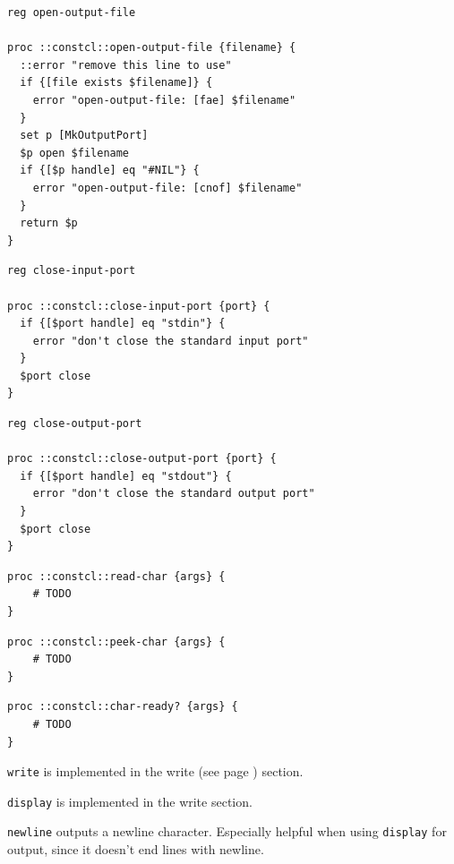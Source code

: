 \documentclass[twoside,9pt]{report}
\begin{document}
\noindent\makebox[\linewidth]{\rule{\linewidth}{0.4pt}}
\noindent\makebox[\linewidth]{\rule{\linewidth}{0.4pt}}
\begin{lstlisting}
reg open-output-file
 
proc ::constcl::open-output-file {filename} {
  ::error "remove this line to use"
  if {[file exists $filename]} {
    error "open-output-file: [fae] $filename"
  }
  set p [MkOutputPort]
  $p open $filename
  if {[$p handle] eq "#NIL"} {
    error "open-output-file: [cnof] $filename"
  }
  return $p
}
\end{lstlisting}
\noindent\makebox[\linewidth]{\rule{\linewidth}{0.4pt}}
\noindent\makebox[\linewidth]{\rule{\linewidth}{0.4pt}}
\begin{lstlisting}
reg close-input-port
 
proc ::constcl::close-input-port {port} {
  if {[$port handle] eq "stdin"} {
    error "don't close the standard input port"
  }
  $port close
}
\end{lstlisting}
\noindent\makebox[\linewidth]{\rule{\linewidth}{0.4pt}}
\noindent\makebox[\linewidth]{\rule{\linewidth}{0.4pt}}
\begin{lstlisting}
reg close-output-port
 
proc ::constcl::close-output-port {port} {
  if {[$port handle] eq "stdout"} {
    error "don't close the standard output port"
  }
  $port close
}
\end{lstlisting}
\noindent\makebox[\linewidth]{\rule{\linewidth}{0.4pt}}
\noindent\makebox[\linewidth]{\rule{\linewidth}{0.4pt}}
\begin{lstlisting}
proc ::constcl::read-char {args} {
    # TODO
}
\end{lstlisting}
\noindent\makebox[\linewidth]{\rule{\linewidth}{0.4pt}}
\noindent\makebox[\linewidth]{\rule{\linewidth}{0.4pt}}
\begin{lstlisting}
proc ::constcl::peek-char {args} {
    # TODO
}
\end{lstlisting}
\noindent\makebox[\linewidth]{\rule{\linewidth}{0.4pt}}
\noindent\makebox[\linewidth]{\rule{\linewidth}{0.4pt}}
\begin{lstlisting}
proc ::constcl::char-ready? {args} {
    # TODO
}
\end{lstlisting}
\noindent\makebox[\linewidth]{\rule{\linewidth}{0.4pt}}

\texttt{write} is implemented in the write (see page \pageref{write}) section.


\texttt{display} is implemented in the write section.


\texttt{newline} outputs a newline character. Especially helpful when using \texttt{display} for output, since it doesn't end lines with newline.
\end{document}
